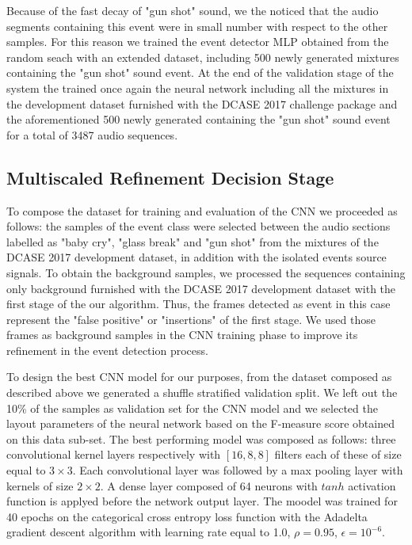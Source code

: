 \documentclass{article}
\begin{document}
\begin{sloppy}
Because of the fast decay of "gun shot" sound, we the noticed that the audio segments containing this event were in small number with respect to the other samples. For this reason we trained the event detector MLP obtained from the random seach with an extended dataset, including 500 newly generated mixtures containing the "gun shot" sound event.
At the end of the validation stage of the system the trained once again the neural network including all the mixtures in the development dataset furnished with the DCASE 2017 challenge package and the aforementioned 500 newly generated containing the "gun shot" sound event for a total of 3487 audio sequences.

\subsection{Multiscaled Refinement Decision Stage}
%

To compose the dataset for training and evaluation of the CNN we proceeded as follows: the samples of the event class were selected between the audio sections labelled as "baby cry", "glass break" and "gun shot" from the mixtures of the DCASE 2017 development dataset, in addition with the isolated events source signals. To obtain the background samples, we processed the sequences containing only background furnished with the DCASE 2017 development dataset with the first stage of the our algorithm. Thus, the frames detected as event in this case represent the "false positive" or "insertions" of the first stage. We used those frames as background samples in the CNN training phase to improve its refinement in the event detection process. 

To design the best CNN model for our purposes, from the dataset composed as described above we generated a shuffle stratified validation split. We left out the 10\% of the samples as validation set for the CNN model and we selected the layout parameters of the neural network based on the F-measure score obtained on this data sub-set. The best performing model was composed as follows: three convolutional kernel layers respectively with $[16, 8, 8]$ filters each of these of size equal to $3\times3$. Each convolutional layer was followed by a max pooling layer with kernels of size $2\times2$. A dense layer composed of 64 neurons with $tanh$ activation function is applyed before the network output layer. The moodel was trained for 40 epochs on the categorical cross entropy loss function with the Adadelta gradient descent algorithm with learning rate equal to 1.0, $\rho=0.95$, $\epsilon=10^{-6}$.



\end{sloppy}
\end{document}
